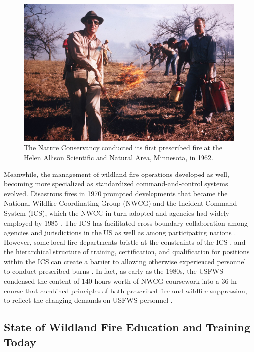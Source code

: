 \documentclass[fire,casereport,accept,moreauthors,pdftex]{Definitions/mdpi}  %
\begin{document}
\begin{figure}[H]
\includegraphics[width=1\columnwidth]{TNC_fire.jpg}
\caption{The Nature Conservancy conducted its first prescribed fire at the Helen Allison Scientific and Natural Area, Minnesota, in 1962. \label{TNCfire}}
\end{figure}

Meanwhile, the management of wildland fire operations developed as well, becoming more specialized as standardized command-and-control systems evolved.
Disastrous fires in 1970 prompted developments that became the National Wildfire Coordinating Group (NWCG) and the Incident Command System (ICS), which the NWCG in turn adopted and agencies had widely employed by 1985 \citep{dague2015, wilson1978}.
The ICS has facilitated cross-boundary collaboration among agencies and jurisdictions in the US as well as among participating nations \citep{goldammer2004}.
However, some local fire departments bristle at the constraints of the ICS \citep{jensen2011}, and the hierarchical structure of training, certification, and qualification for positions within the ICS can create a barrier to allowing otherwise experienced personnel to conduct prescribed burns \citep{spencer2015}.
In fact, as early as the 1980s, the USFWS condensed the content of 140 hours worth of NWCG coursework into a 36-hr course that combined principles of both prescribed fire and wildfire suppression, to reflect the changing demands on USFWS personnel \citep{murphy1987}.

\subsection{State of Wildland Fire Education and Training Today}
\end{document}
